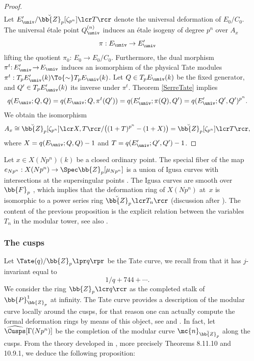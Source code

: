 \begin{proof}
\begin{multline*}
\end{multline*}
Let $E'_{\univ}/\breve{\bb{Z}}_p[\zeta_{p^n}]\lcr T\rcr$ denote the universal deformation of $E_0/C_0$. The universal étale point $Q_{\univ}^{(n)}$ induces an étale isogeny of degree $p^n$ over $A_{x}$
\[
\pi: E_{\univ}\to E'_{\univ}
\]
lifting the quotient $\pi_0{:}\,E_0\!\to\!E_0/C_0$. Furthermore, the dual morphism \hbox{$\pi^t{:}\,E'_{\univ}\!\to\!E_{\univ}$} induces an isomorphism of the physical Tate modules $\pi^{t}: T_pE'_{\univ}(k)\To{\sim} T_p E_{\univ}(k)$. Let $Q\in T_{p} E_{\univ}(k)$ be the fixed generator, and $Q'\in T_{p} E'_{\univ}(k)$ its inverse under $\pi^t$. Theorem \ref{SerreTate} implies
\[
q(E_{\univ}; Q,Q)=q(E_{\univ}; Q,\pi^{t}(Q'))=q(E'_{\univ};\pi(Q), Q')=q(E'_{\univ};Q',Q')^{p^n}.
\]
We obtain the isomorphism
\[
A_{x}\cong \breve{\bb{Z}}_p[\zeta_{p^n}]\lcr X, T\rcr/\bigl((1+T)^{p^n}-(1+X)\bigr)=\breve{\bb{Z}}_p[\zeta_{p^n}]\lcr T\rcr,
\]
where $X=q(E_{\univ};Q,Q)-1$ and $T=q(E'_{\univ}; Q',Q')-1$.
\end{proof}

\begin{remark}
Let $x\in X(Np^n)(k)$ be a closed ordinary point. The special fiber of the map $e_{Np^n}: X(Np^n)\to \Spec \bb{Z}_p[\mu_{Np^n}]$ is a union of Igusa curves with intersections at the supersingular points \cite[Th.\,13.10.3]{katz1985arithmetic}. The Igusa curves are smooth over~$\bb{F}_p$ \cite[Th.\,12.6.1]{katz1985arithmetic}, which implies that the deformation ring of $X(Np^n)$ at~$x$ is isomorphic to a power series ring $\breve{\bb{Z}}_p\lcr T_n\rcr$ (\cf discussion after \cite[Rem.\,3.4.4]{WeinsteinModinfinite}). The content of the previous proposition is the explicit relation between the variables~$T_n$ in the modular tower, see also \cite[Prop.\,2.2]{JacobFullLevel2019}.
\end{remark}

\subsubsection*{The cusps}

Let $\Tate(q)/\bb{Z}_p\lpr q\rpr$ be the Tate curve, we recall from \!\cite[Ch.\,8.8]{katz1985arithmetic} that it has $j$-invariant equal to
\[1/q+744+\cdots.\]
We consider the ring $\bb{Z}_p\lcr q\rcr$ as the completed stalk of $\bb{P}^1_{\bb{Z}_p}$ at infinity. The Tate curve provides a description of the modular curve locally around the cusps, for that reason one can actually compute the formal deformation rings by means of this object, see \cite{katz1985arithmetic} and \cite{deligne1973schemas}. In fact, let $\widehat{\Cusps}[\Gamma(Np^n)]$ be the completion of the modular curve $\mc{n}_{\breve{\bb{Z}}_p}$ along the cusps. From the theory developed in \cite[Ch.\,8\,\&\,10]{katz1985arithmetic}, more precisely Theorems 8.11.10 and 10.9.1, we deduce the following proposition:

